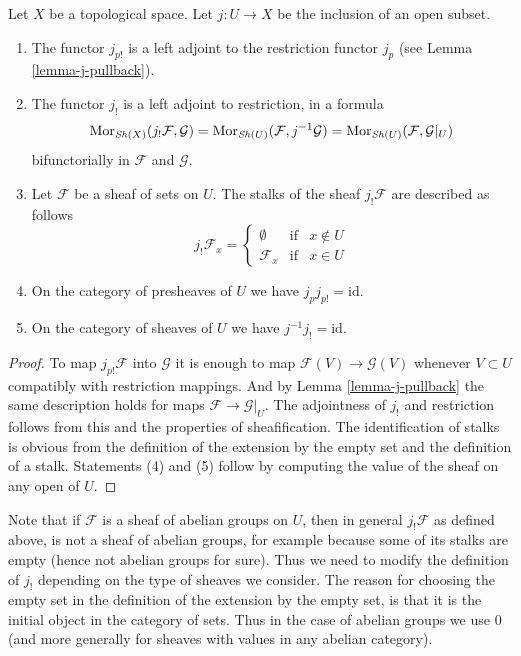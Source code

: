 \begin{lemma}
\label{lemma-j-shriek}
Let $X$ be a topological space.
Let $j : U \to X$ be the inclusion of an open subset.
\begin{enumerate}
\item The functor $j_{p!}$ is a left adjoint to the
restriction functor $j_p$ (see Lemma \ref{lemma-j-pullback}).
\item The functor $j_!$ is a left adjoint to restriction,
in a formula
$$
\mathop{\mathrm{Mor}}\nolimits_{\mathop{\mathit{Sh}}\nolimits(X)}(j_!\mathcal{F}, \mathcal{G})
=
\mathop{\mathrm{Mor}}\nolimits_{\mathop{\mathit{Sh}}\nolimits(U)}(\mathcal{F}, j^{-1}\mathcal{G})
=
\mathop{\mathrm{Mor}}\nolimits_{\mathop{\mathit{Sh}}\nolimits(U)}(\mathcal{F}, \mathcal{G}|_U)
$$
bifunctorially in $\mathcal{F}$ and $\mathcal{G}$.
\item Let $\mathcal{F}$ be a sheaf of sets on $U$.
The stalks of the sheaf $j_!\mathcal{F}$ are described
as follows
$$
j_{!}\mathcal{F}_x =
\left\{
\begin{matrix}
\emptyset & \text{if} & x \not \in U \\
\mathcal{F}_x & \text{if} & x \in U
\end{matrix}
\right.
$$
\item On the category of presheaves of $U$ we have $j_pj_{p!} = \text{id}$.
\item On the category of sheaves of $U$ we have $j^{-1}j_! = \text{id}$.
\end{enumerate}
\end{lemma}

\begin{proof}
To map $j_{p!}\mathcal{F}$ into $\mathcal{G}$
it is enough to map $\mathcal{F}(V) \to \mathcal{G}(V)$
whenever $V \subset U$ compatibly with restriction
mappings. And by Lemma \ref{lemma-j-pullback}
the same description holds for maps
$\mathcal{F} \to \mathcal{G}|_U$.
The adjointness of $j_!$ and restriction follows
from this and the properties of sheafification.
The identification of stalks is obvious from the
definition of the extension by the empty set
and the definition of a stalk.
Statements (4) and (5) follow by computing the
value of the sheaf on any open of $U$.
\end{proof}

\noindent
Note that if $\mathcal{F}$ is a sheaf
of abelian groups on $U$, then in general $j_!\mathcal{F}$ as
defined above, is not a sheaf of abelian groups, for example
because some of its stalks are empty (hence not abelian groups
for sure). Thus we need to modify the definition of
$j_!$ depending on the type of sheaves we consider.
The reason for choosing the empty set in the definition of the
extension by the empty set, is that it is the initial object
in the category of sets. Thus in the case of abelian groups
we use $0$ (and more generally for sheaves with values in
any abelian category).

